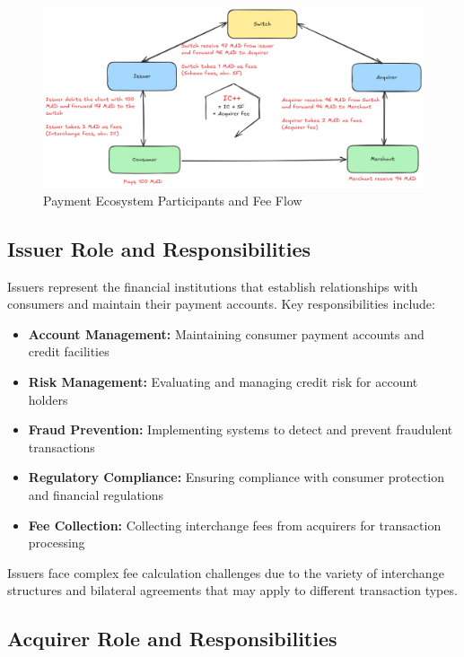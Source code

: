 \begin{figure}[H]
    \centering
    \includegraphics[width=\textwidth]{img/Txn_Actors.png}
    \caption{Payment Ecosystem Participants and Fee Flow}
\end{figure}

\subsection{Issuer Role and Responsibilities}

Issuers represent the financial institutions that establish relationships with consumers and maintain their payment accounts. Key responsibilities include:

\begin{itemize}
    \item \textbf{Account Management:} Maintaining consumer payment accounts and credit facilities
    \item \textbf{Risk Management:} Evaluating and managing credit risk for account holders
    \item \textbf{Fraud Prevention:} Implementing systems to detect and prevent fraudulent transactions
    \item \textbf{Regulatory Compliance:} Ensuring compliance with consumer protection and financial regulations
    \item \textbf{Fee Collection:} Collecting interchange fees from acquirers for transaction processing
\end{itemize}

Issuers face complex fee calculation challenges due to the variety of interchange structures and bilateral agreements that may apply to different transaction types.

\subsection{Acquirer Role and Responsibilities}

